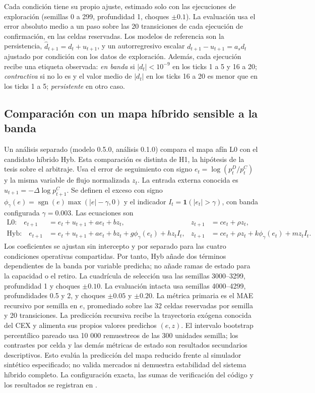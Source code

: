 Cada condición tiene su propio ajuste, estimado solo con las ejecuciones de exploración (semillas 0 a 299, profundidad 1, choques $\pm0.1$). La evaluación usa el error absoluto medio a un paso sobre las 20 transiciones de cada ejecución de confirmación, en las celdas reservadas. Los modelos de referencia son la persistencia, $\hat d_{t+1}=d_t+u_{t+1}$, y un autorregresivo escalar $d_{t+1}-u_{t+1}=a_s d_t$ ajustado por condición con los datos de exploración. Además, cada ejecución recibe una etiqueta observada: \emph{en banda} si $|d_t|<10^{-9}$ en los ticks 1 a 5 y 16 a 20; \emph{contractiva} si no lo es y el valor medio de $|d_t|$ en los ticks 16 a 20 es menor que en los ticks 1 a 5; \emph{persistente} en otro caso.

\subsection{Comparación con un mapa híbrido sensible a la banda}
\label{sec:hybrid-method}

Un análisis separado (modelo 0.5.0, análisis 0.1.0) compara el mapa afín L0 con el candidato híbrido Hyb. Esta comparación es distinta de H1, la hipótesis de la tesis sobre el arbitraje. Usa el error de seguimiento con signo $e_t=\log(p_t^D/p_t^C)$ y la misma variable de flujo normalizada $z_t$. La entrada externa conocida es $u_{t+1}=-\Delta\log p^C_{t+1}$. Se definen el exceso con signo $\phi_\gamma(e)=\operatorname{sgn}(e)\max(|e|-\gamma,0)$ y el indicador $I_t=\mathbf{1}(|e_t|>\gamma)$, con banda configurada $\gamma=0.003$. Las ecuaciones son
\begin{align}
  \text{L0:}\quad e_{t+1}&=e_t+u_{t+1}+a e_t+b z_t,& z_{t+1}&=c e_t+\rho z_t,\\
  \text{Hyb:}\quad e_{t+1}&=e_t+u_{t+1}+a e_t+b z_t+g\phi_\gamma(e_t)+h z_t I_t,&
  z_{t+1}&=c e_t+\rho z_t+k\phi_\gamma(e_t)+m z_t I_t.
\end{align}
Los coeficientes se ajustan sin intercepto y por separado para las cuatro condiciones operativas compartidas. Por tanto, Hyb añade dos términos dependientes de la banda por variable predicha; no añade ramas de estado para la capacidad o el retiro. La cuadrícula de selección usa las semillas 3000--3299, profundidad 1 y choques $\pm0.10$. La evaluación intacta usa semillas 4000--4299, profundidades 0.5 y 2, y choques $\pm0.05$ y $\pm0.20$. La métrica primaria es el MAE recursivo por semilla en $e$, promediado sobre las 32 celdas reservadas por semilla y 20 transiciones. La predicción recursiva recibe la trayectoria exógena conocida del CEX y alimenta sus propios valores predichos $(e,z)$. El intervalo bootstrap percentílico pareado usa 10 000 remuestreos de las 300 unidades semilla; los contrastes por celda y las demás métricas de estado son resultados secundarios descriptivos. Esto evalúa la predicción del mapa reducido frente al simulador sintético especificado; no valida mercados ni demuestra estabilidad del sistema híbrido completo. La configuración exacta, las sumas de verificación del código y los resultados se registran en .


